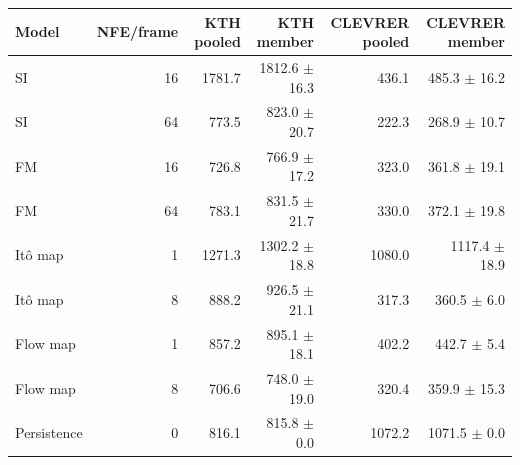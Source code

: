 \begin{tabular}{lrrrrr}
\toprule
Model & NFE/frame & KTH pooled & KTH member & CLEVRER pooled & CLEVRER member \\
\midrule
SI & 16 & 1781.7 & 1812.6 $\pm$ 16.3 & 436.1 & 485.3 $\pm$ 16.2 \\
SI & 64 & 773.5 & 823.0 $\pm$ 20.7 & 222.3 & 268.9 $\pm$ 10.7 \\
FM & 16 & 726.8 & 766.9 $\pm$ 17.2 & 323.0 & 361.8 $\pm$ 19.1 \\
FM & 64 & 783.1 & 831.5 $\pm$ 21.7 & 330.0 & 372.1 $\pm$ 19.8 \\
It\^o map & 1 & 1271.3 & 1302.2 $\pm$ 18.8 & 1080.0 & 1117.4 $\pm$ 18.9 \\
It\^o map & 8 & 888.2 & 926.5 $\pm$ 21.1 & 317.3 & 360.5 $\pm$ 6.0 \\
Flow map & 1 & 857.2 & 895.1 $\pm$ 18.1 & 402.2 & 442.7 $\pm$ 5.4 \\
Flow map & 8 & 706.6 & 748.0 $\pm$ 19.0 & 320.4 & 359.9 $\pm$ 15.3 \\
Persistence & 0 & 816.1 & 815.8 $\pm$ 0.0 & 1072.2 & 1071.5 $\pm$ 0.0 \\
\bottomrule
\end{tabular}
